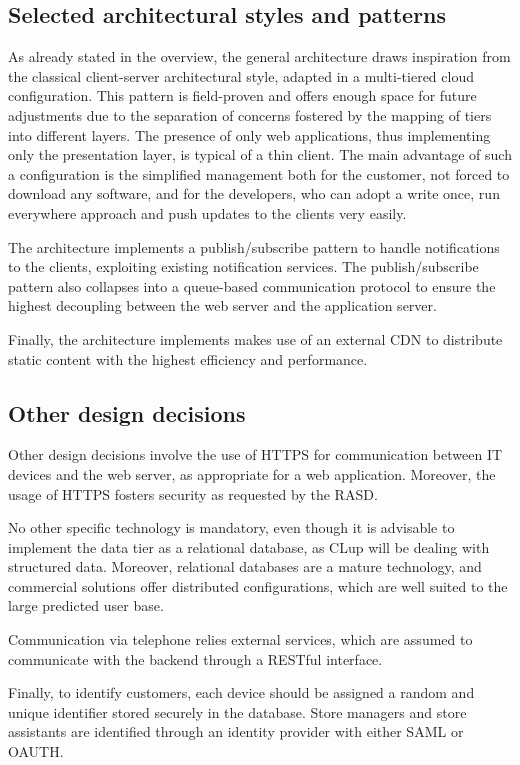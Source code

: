 \documentclass[../../main.tex]{subfiles}
\begin{document}
\subsection{Selected architectural styles and patterns}


    As already stated in the overview, the general architecture draws inspiration from the classical client-server architectural style, adapted in a multi-tiered cloud configuration.  
    This pattern is field-proven and offers enough space for future adjustments due to the separation of concerns fostered by the mapping of tiers into different layers.
    The presence of only web applications, thus implementing only the presentation layer, is typical of a thin client. The main advantage of such a configuration is the simplified management both for the customer, not forced to download any software, and for the developers, who can adopt a write once, run everywhere approach and push updates to the clients very easily.

    The architecture implements a publish/subscribe pattern to handle notifications to the clients, exploiting existing notification services. 
    The publish/subscribe pattern also collapses into a queue-based communication protocol to ensure the highest decoupling between the web server and the application server.

    Finally, the architecture implements makes use of an external CDN to distribute static content with the highest efficiency and performance.

\subsection{Other design decisions}


    Other design decisions involve the use of HTTPS for communication between IT devices and the web server, as appropriate for a web application. 
    Moreover, the usage of HTTPS fosters security as requested by the RASD.

    No other specific technology is mandatory, even though it is advisable to implement the data tier as a relational database, 
    as CLup will be dealing with structured data. Moreover, relational databases are a mature technology, and commercial solutions offer distributed configurations, 
    which are well suited to the large predicted user base.

    Communication via telephone relies external services, which are assumed to communicate with the backend through a RESTful interface.

    Finally, to identify customers, each device should be assigned a random and unique identifier stored securely in the database. Store managers and store assistants are identified through
    an identity provider with either SAML or OAUTH. 
\end{document}
